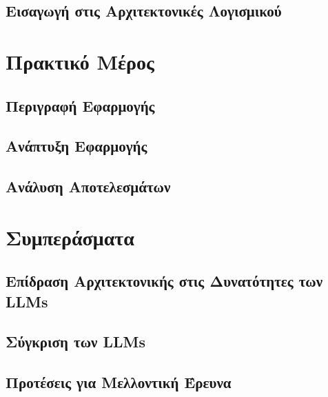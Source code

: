 \documentclass[11pt]{report}
\begin{document}
\section{Εισαγωγή στις Αρχιτεκτονικές Λογισμικού}


\chapter{Πρακτικό Μέρος}

\section{Περιγραφή Εφαρμογής}


\section{Ανάπτυξη Εφαρμογής}


\section{Ανάλυση Αποτελεσμάτων}


\chapter{Συμπεράσματα}

\section{Επίδραση Αρχιτεκτονικής στις Δυνατότητες των LLMs}


\section{Σύγκριση των LLMs}


\section{Προτέσεις για Μελλοντική Έρευνα}







\end{document}
